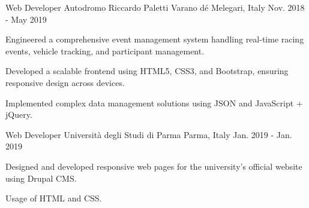 \begin{cventries}
  \cventry
  {Web Developer} %
  {Autodromo Riccardo Paletti} %
  {Varano dé Melegari, Italy} %
  {Nov. 2018 - May 2019} %
  {
    \begin{cvitems} %
      \item {Engineered a comprehensive event management system handling real-time racing events, vehicle tracking, and participant management.}
      \item {Developed a scalable frontend using HTML5, CSS3, and Bootstrap, ensuring responsive design across devices.}
      \item {Implemented complex data management solutions using JSON and JavaScript + jQuery.}
    \end{cvitems}
  }
  \cventry
  {Web Developer} %
  {Università degli Studi di Parma} %
  {Parma, Italy} %
  {Jan. 2019 - Jan. 2019} %
  {
    \begin{cvitems} %
      \item {Designed and developed responsive web pages for the university's official website using Drupal CMS.}
      \item {Usage of HTML and CSS.}
    \end{cvitems}
  }
\end{cventries}
